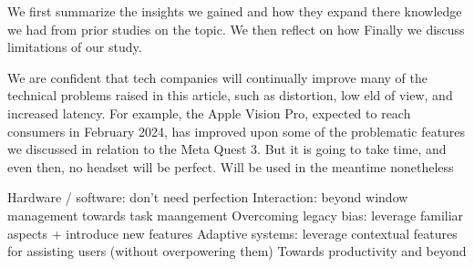 We first summarize the insights we gained and how they expand there knowledge we had from prior studies on the topic. 
We then reflect on how 
Finally we discuss limitations of our study. 

\cite{bailenson2024seeing}
We are confident that tech companies will continually improve
many of the technical problems raised in this article, such as
distortion, low eld of view, and increased latency. For example, the
Apple Vision Pro, expected to reach consumers in February 2024,
has improved upon some of the problematic features we discussed in
relation to the Meta Quest 3. But it is going to take time, and even
then, no headset will be perfect.
Will be used in the meantime nonetheless

Hardware / software: don't need perfection 
Interaction: beyond window management towards task maangement
Overcoming legacy bias: leverage familiar aspects + introduce new features 
Adaptive systems: leverage contextual features for assisting users (without overpowering them)
Towards productivity and beyond 
